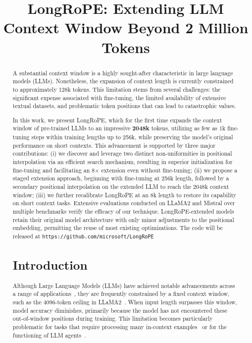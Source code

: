\title{LongRoPE: Extending LLM Context Window Beyond 2 Million Tokens}

\begin{abstract}
A substantial context window is a highly sought-after characteristic in large language models (LLMs). Nonetheless, the expansion of context length is currently constrained to approximately 128k tokens. This limitation stems from several challenges: the significant expense associated with fine-tuning, the limited availability of extensive textual datasets, and problematic token positions that can lead to catastrophic values.

In this work, we present LongRoPE, which for the first time expands the context window of pre-trained LLMs to an impressive \textbf{2048k} tokens, utilizing as few as 1k fine-tuning steps within training lengths up to 256k, while preserving the model's original performance on short contexts. This advancement is supported by three major contributions: (i) we discover and leverage two distinct non-uniformities in positional interpolation via an efficient search mechanism, resulting in superior initialization for fine-tuning and facilitating an 8$\times$ extension even without fine-tuning; (ii) we propose a staged extension approach, beginning with fine-tuning at 256k length, followed by a secondary positional interpolation on the extended LLM to reach the 2048k context window; (iii) we further recalibrate LongRoPE at an 8k length to restore its capability on short context tasks. Extensive evaluations conducted on LLaMA2 and Mistral over multiple benchmarks verify the efficacy of our technique. LongRoPE-extended models retain their original model architecture with only minor adjustments to the positional embedding, permitting the reuse of most existing optimizations. The code will be released at \texttt{https://github.com/microsoft/LongRoPE}

\section{Introduction}

Although Large Language Models (LLMs) have achieved notable advancements across a range of applications~\cite{gpt4,llama2}, they are frequently constrained by a fixed context window, such as the 4096-token ceiling in LLaMA2~\cite{llama2}. When input length surpasses this window, model accuracy diminishes, primarily because the model has not encountered these out-of-window positions during training. This limitation becomes particularly problematic for tasks that require processing many in-context examples~\cite{Huang2023FewerIM} or for the functioning of LLM agents~\cite{park2023generative,madaan2023selfrefine}.


\end{abstract}
